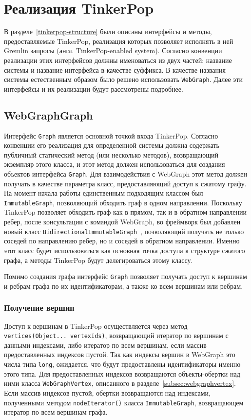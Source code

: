 \documentclass[times,specification,annotation]{itmo-student-thesis}
\begin{document}
\section{Реализация TinkerPop}

В разделе~\ref{tinkerpop-structure} были описаны интерфейсы и методы, предоставляемые TinkerPop, реализация которых позволяет исполнять в ней Gremlin запросы (англ. TinkerPop-enabled system). Согласно конвенции реализации этих интерфейсов должны именоваться из двух частей: название системы и название интерфейса в качестве суффикса. В качестве названия системы естественным образом было решено использовать \texttt{WebGraph}. Далее эти интерфейсы и их реализации будут рассмотрены подробнее. 

\subsection{WebGraphGraph}

Интерфейс \texttt{Graph} является основной точкой входа TinkerPop. Согласно конвенции его реализация для определенной системы должна содержать публичный статический метод (или несколько методов), возвращающий экземпляр этого класса, и этот метод должен использоваться для создания объектов интерфейса \texttt{Graph}.
Для взаимодействия с WebGraph этот метод должен получать в качестве параметра класс, предоставляющий доступ к сжатому графу. На момент начала работы единственным подходящим классом был \texttt{ImmutableGraph}, позволяющий обходить граф в одном направлении.
Поскольку TinkerPop позволяет обходить граф как в прямом, так и в обратном направлении ребер, после консультации с командой WebGraph, во фреймворк был добавлен новый класс \texttt{BidirectionalImmutableGraph}~\cite{vigna-bidir}, позволяющий получать не только соседей по направлению ребер, но и соседей в обратном направлении. Именно этот класс будет использоваться как основная точка доступа к структуре сжатого графа, а методы TinkerPop будут делегироваться этому классу.

Помимо создания графа интерфейс \texttt{Graph} позволяет получать доступ к вершинам и ребрам графа по их идентификаторам, а также ко всем вершинам или ребрам.

\subsubsection{Получение вершин}

Доступ к вершинам в TinkerPop осуществляется через метод \texttt{vertices(Object... vertexIds)}, возвращающий итератор по вершинам с данными индексами, либо итератор по всем вершинам, если массив предоставленных индексов пустой.
Так как индексы вершин в WebGraph это числа типа \texttt{long}, ожидается, что будут предоставлены идентификаторы именно этого типа.
Для предоставленных индексов возвращаются объекты-обертки над ними класса \texttt{WebGraphVertex}, описанного в разделе~\ref{subsec:webgraphvertex}.
Если массив индексов пустой, обертки возвращаются над индексами, полученными методом \texttt{nodeIterator()} класса \texttt{ImmutableGraph}, возвращающем итератор по всем вершинам графа.
\end{document}
